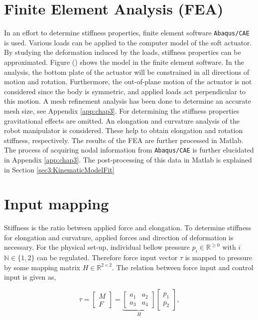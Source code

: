 
\section{Finite Element Analysis (FEA)}

In an effort to determine stiffness properties, finite element software \verb+Abaqus/CAE+ is used. Various loads can be applied to the computer model of the soft actuator. By studying the deformation induced by the loads, stiffness properties can be approximated. Figure () shows the model in the finite element software. In the analysis, the bottom plate of the actuator will be constrained in all directions of motion and rotation. Furthermore, the out-of-plane motion of the actuator is not considered since the body is symmetric, and applied loads act perpendicular to this motion. A mesh refinement analysis has been done to determine an accurate mesh size, see Appendix \ref{app:chap3}. For determining the stiffness properties gravitational effects are omitted. An elongation and curvature analysis of the robot manipulator is considered. These help to obtain elongation and rotation stiffness, respectively. The results of the FEA are further processed in Matlab. The process of acquiring nodal information from \verb+Abaqus/CAE+ is further elucidated in Appendix \ref{app:chap3}. The post-processing of this data in Matlab is explained in Section \ref{sec3:KinematicModelFit}  



\section{Input mapping}
\label{sec3:InputMapping}

Stiffness is the ratio between applied force and elongation. To determine  stiffness for elongation and curvature, applied forces and direction of deformation is necessary. For the physical set-up, individual bellow pressure $p_i \in \mathbb{R}^{\geq 0}$ with $i$ $\mathbb{N} \in \{1,2\}$ can be regulated. Therefore force input vector $\tau$ is mapped to pressure by some mapping matrix $H \in \mathbb{R}^{2 \times 2}$. The relation between force input and control input is given as, 

\begin{equation}
   \tau =   \begin{bmatrix} M \\ F \end{bmatrix}     = \underbrace{\begin{bmatrix}  a_1 & a_2 \\ a_3 & a_4 \end{bmatrix}}_{H}         \begin{bmatrix}  p_1 \\ p_2 \end{bmatrix}, \label{eq3:H}
\end{equation}

